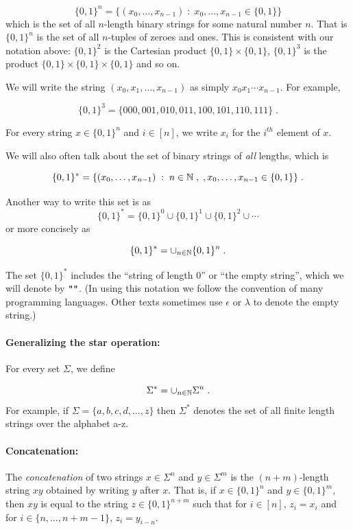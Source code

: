 \[
\{0,1\}^n = \{ (x_0,\ldots,x_{n-1}) \;:\; x_0,\ldots,x_{n-1} \in \{0,1\}  \}
\] which is the set of all \(n\)-length binary strings for some natural
number \(n\). That is \(\{0,1\}^n\) is the set of all \(n\)-tuples of
zeroes and ones. This is consistent with our notation above:
\(\{0,1\}^2\) is the Cartesian product \(\{0,1\} \times \{0,1\}\),
\(\{0,1\}^3\) is the product \(\{0,1\} \times \{0,1\} \times \{0,1\}\)
and so on.

We will write the string \((x_0,x_1,\ldots,x_{n-1})\) as simply
\(x_0x_1\cdots x_{n-1}\). For example,

\[
\{0,1\}^3 = \{ 000 , 001, 010 , 011, 100, 101, 110, 111 \} \;.
\]

For every string \(x\in \{0,1\}^n\) and \(i\in [n]\), we write \(x_i\)
for the \(i^{th}\) element of \(x\).

We will also often talk about the set of binary strings of \emph{all}
lengths, which is

\[
\{0,1\}^* = \{ (x_0,\ldots,x_{n-1}) \;:\; n\in{\mathbb{N}} \;,\;, x_0,\ldots,x_{n-1} \in \{0,1\} \} \;.
\]

Another way to write this set is as \[
\{0,1\}^* = \{0,1\}^0 \cup \{0,1\}^1 \cup \{0,1\}^2 \cup \cdots
\] or more concisely as

\[
\{0,1\}^* = \cup_{n\in{\mathbb{N}}} \{0,1\}^n \;.
\]

The set \(\{0,1\}^*\) includes the ``string of length \(0\)'' or ``the
empty string'', which we will denote by
\(\ensuremath{\text{\texttt{""}}}\). (In using this notation we follow
the convention of many programming languages. Other texts sometimes use
\(\epsilon\) or \(\lambda\) to denote the empty string.)

\paragraph{Generalizing the star operation:} For every set \(\Sigma\),
we define

\[\Sigma^* = \cup_{n\in {\mathbb{N}}} \Sigma^n \;.\] For example, if
\(\Sigma = \{a,b,c,d,\ldots,z \}\) then \(\Sigma^*\) denotes the set of
all finite length strings over the alphabet a-z.

\paragraph{Concatenation:} The \emph{concatenation} of two strings
\(x\in \Sigma^n\) and \(y\in \Sigma^m\) is the \((n+m)\)-length string
\(xy\) obtained by writing \(y\) after \(x\). That is, if
\(x \in \{0,1\}^n\) and \(y\in \{0,1\}^m\), then \(xy\) is equal to the
string \(z\in \{0,1\}^{n+m}\) such that for \(i\in [n]\), \(z_i=x_i\)
and for \(i\in \{n,\ldots,n+m-1\}\), \(z_i = y_{i-n}\).

